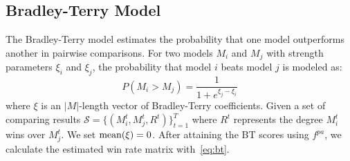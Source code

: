 \subsection{Bradley-Terry Model}
\label{app:bt}
The Bradley-Terry model \citep{BT} estimates the probability that one model outperforms another in pairwise comparisons. For two models $M_i$ and $M_j$ with strength parameters $\xi_i$ and $\xi_j$, the probability that model $i$ beats model $j$ is modeled as:
\begin{equation}
\label{eq:bt}
P(M_i>M_j) = \frac{1}{1 + e^{\xi_j - \xi_i}}    
\end{equation}
where $\xi$ is an $|M|$-length vector of Bradley-Terry coefficients. Given a set of comparing results $\mathcal{S}=\{(M_i^t,M_j^t,R^t)\}_{t=1}^{T}$ where $R^t$ represents the degree $M_i^t$ wins over $M_j^t$. We set $\rm{mean}(\xi) = 0$.
After attaining the BT scores using $f^{pa}$, we calculate the estimated win rate matrix with~\eqref{eq:bt}.













